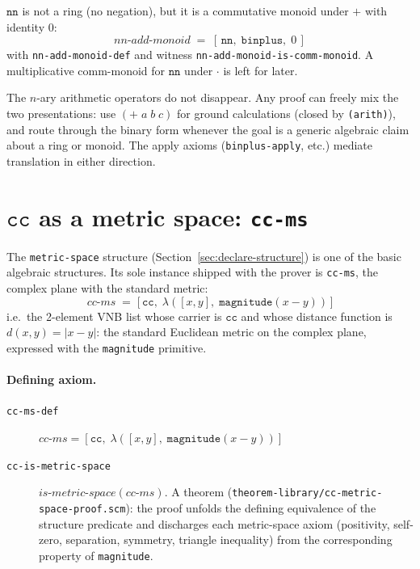 $\mathtt{nn}$ is not a ring (no negation), but it is a commutative
monoid under $+$ with identity $0$:
\[
   \mathit{nn\text{-}add\text{-}monoid} \;=\; [\,\mathtt{nn},\;
     \mathtt{binplus},\; 0\,]
\]
with \texttt{nn-add-monoid-def} and witness
\texttt{nn-add-monoid-is-comm-monoid}.  A multiplicative
comm-monoid for $\mathtt{nn}$ under $\cdot$ is left for later.

\begin{remark}
The $n$-ary arithmetic operators do not disappear.  Any proof can
freely mix the two presentations: use $(+\; a\; b\; c)$ for ground
calculations (closed by \texttt{(arith)}), and route through the
binary form whenever the goal is a generic algebraic claim about a
ring or monoid.  The apply axioms (\texttt{binplus-apply}, etc.)
mediate translation in either direction.
\end{remark}

\section{$\mathtt{cc}$ as a metric space: \texttt{cc-ms}}
\label{sec:cc-ms}

The \texttt{metric-space} structure (Section~\ref{sec:declare-structure})
is one of the basic algebraic structures.  Its sole instance shipped
with the prover is \texttt{cc-ms}, the complex plane with the standard
metric:
\[
   \mathit{cc\text{-}ms} \;=\; \bigl[\,\mathtt{cc},\;
     \lambda([x, y],\; \mathtt{magnitude}(x - y))\,\bigr]
\]
i.e.\ the 2-element VNB list whose carrier is $\mathtt{cc}$ and whose
distance function is $d(x, y) = |x - y|$: the standard Euclidean metric
on the complex plane, expressed with the \texttt{magnitude} primitive.

\paragraph{Defining axiom.}
\begin{description}
\item[\texttt{cc-ms-def}]
  $\mathit{cc\text{-}ms} = [\mathtt{cc},\; \lambda([x, y],\;
   \mathtt{magnitude}(x - y))]$
\item[\texttt{cc-is-metric-space}]
  $\mathit{is\text{-}metric\text{-}space}(\mathit{cc\text{-}ms})$.
  A theorem (\texttt{theorem-library/cc-metric-space-proof.scm}): the
  proof unfolds the defining equivalence of the structure predicate and
  discharges each metric-space axiom (positivity, self-zero,
  separation, symmetry, triangle inequality) from the corresponding
  property of \texttt{magnitude}.
\end{description}

